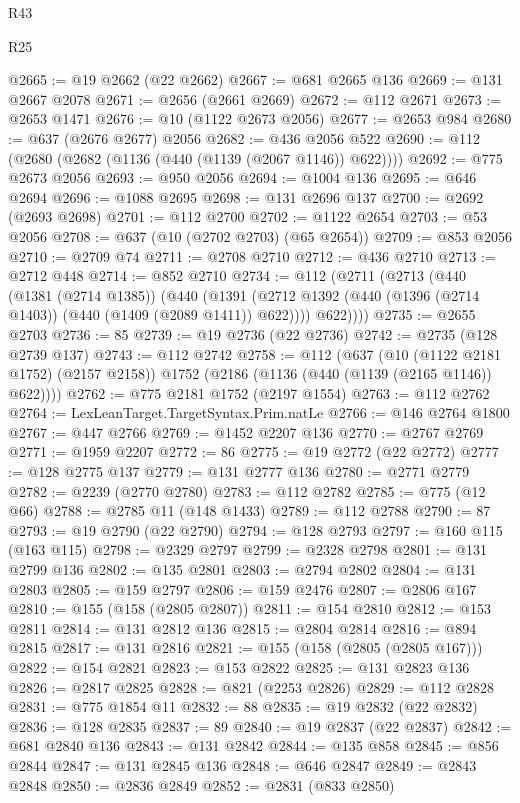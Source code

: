 \begin{lexlean}{R43}
\begin{lexlean}{R25}
\begin{coremodule}
{{{{{{{{{{{{{{{{{{{{{{{{{{{{{{{{{{{{{{{{{{{{{{{{{{{{{{{{{{{{{{{{{{{{{{{{{{{{{{{{{{{{{{{{{{{{{{{{{{{{{{{{{{{{{{{{{{{{{{{{{{{{{{{{{{{{{{{{{{{{{{{{{{{{{{{{{{{{{{{{{{{{{{{{{{{{{{{{{{{{{{{{{{{{{{{{{@2665 := @19 @2662 (@22 @2662)
@2667 := @681 @2665 @136
@2669 := @131 @2667 @2078
@2671 := @2656 (@2661 @2669)
@2672 := @112 @2671
@2673 := @2653 @1471
@2676 := @10 (@1122 @2673 @2056)
@2677 := @2653 @984
@2680 := @637 (@2676 @2677) @2056
@2682 := @436 @2056 @522
@2690 := @112 (@2680 (@2682 (@1136 (@440 (@1139 (@2067 @1146)) @622))))
@2692 := @775 @2673 @2056
@2693 := @950 @2056
@2694 := @1004 @136
@2695 := @646 @2694
@2696 := @1088 @2695
@2698 := @131 @2696 @137
@2700 := @2692 (@2693 @2698)
@2701 := @112 @2700
@2702 := @1122 @2654
@2703 := @53 @2056
@2708 := @637 (@10 (@2702 @2703) (@65 @2654))
@2709 := @853 @2056
@2710 := @2709 @74
@2711 := @2708 @2710
@2712 := @436 @2710
@2713 := @2712 @448
@2714 := @852 @2710
@2734 := @112
    (@2711
      (@2713
        (@440
          (@1381 (@2714 @1385))
          (@440
            (@1391 (@2712 @1392 (@440 (@1396 (@2714 @1403)) (@440 (@1409 (@2089 @1411)) @622))))
            @622))))
@2735 := @2655 @2703
@2736 := 85
@2739 := @19 @2736 (@22 @2736)
@2742 := @2735 (@128 @2739 @137)
@2743 := @112 @2742
@2758 := @112
    (@637
      (@10 (@1122 @2181 @1752) (@2157 @2158))
      @1752
      (@2186 (@1136 (@440 (@1139 (@2165 @1146)) @622))))
@2762 := @775 @2181 @1752 (@2197 @1554)
@2763 := @112 @2762
@2764 := LexLeanTarget.TargetSyntax.Prim.natLe
@2766 := @146 @2764 @1800
@2767 := @447 @2766
@2769 := @1452 @2207 @136
@2770 := @2767 @2769
@2771 := @1959 @2207
@2772 := 86
@2775 := @19 @2772 (@22 @2772)
@2777 := @128 @2775 @137
@2779 := @131 @2777 @136
@2780 := @2771 @2779
@2782 := @2239 (@2770 @2780)
@2783 := @112 @2782
@2785 := @775 (@12 @66)
@2788 := @2785 @11 (@148 @1433)
@2789 := @112 @2788
@2790 := 87
@2793 := @19 @2790 (@22 @2790)
@2794 := @128 @2793
@2797 := @160 @115 (@163 @115)
@2798 := @2329 @2797
@2799 := @2328 @2798
@2801 := @131 @2799 @136
@2802 := @135 @2801
@2803 := @2794 @2802
@2804 := @131 @2803
@2805 := @159 @2797
@2806 := @159 @2476
@2807 := @2806 @167
@2810 := @155 (@158 (@2805 @2807))
@2811 := @154 @2810
@2812 := @153 @2811
@2814 := @131 @2812 @136
@2815 := @2804 @2814
@2816 := @894 @2815
@2817 := @131 @2816
@2821 := @155 (@158 (@2805 (@2805 @167)))
@2822 := @154 @2821
@2823 := @153 @2822
@2825 := @131 @2823 @136
@2826 := @2817 @2825
@2828 := @821 (@2253 @2826)
@2829 := @112 @2828
@2831 := @775 @1854 @11
@2832 := 88
@2835 := @19 @2832 (@22 @2832)
@2836 := @128 @2835
@2837 := 89
@2840 := @19 @2837 (@22 @2837)
@2842 := @681 @2840 @136
@2843 := @131 @2842
@2844 := @135 @858
@2845 := @856 @2844
@2847 := @131 @2845 @136
@2848 := @646 @2847
@2849 := @2843 @2848
@2850 := @2836 @2849
@2852 := @2831 (@833 @2850)
}}}}}}}}}}}}}}}}}}}}}}}}}}}}}}}}}}}}}}}}}}}}}}}}}}}}}}}}}}}}}}}}}}}}}}}}}}}}}}}}}}}}}}}}}}}}}}}}}}}}}}}}}}}}}}}}}}}}}}}}}}}}}}}}}}}}}}}}}}}}}}}}}}}}}}}}}}}}}}}}}}}}}}}}}}}}}}}}}}}}}}}}}}}}}}}}}
\end{coremodule}
\end{lexlean}
\end{lexlean}
